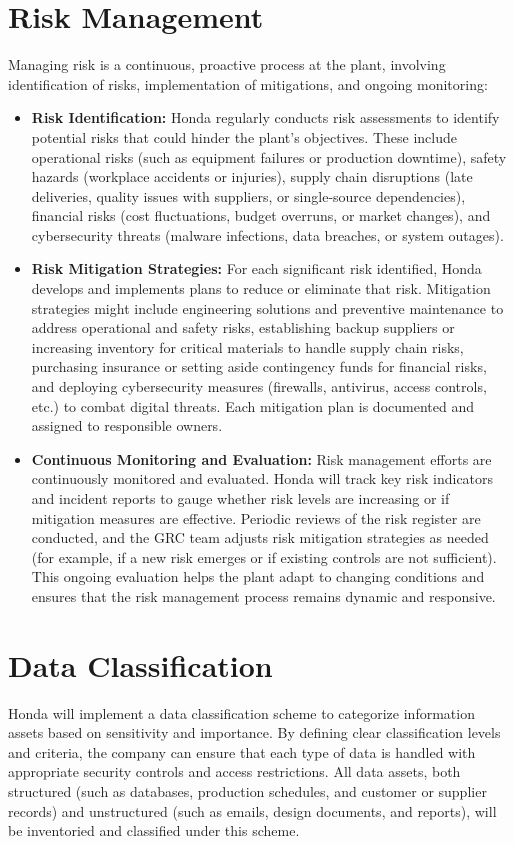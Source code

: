 \section{Risk Management}
Managing risk is a continuous, proactive process at the plant, involving identification of risks, implementation of mitigations, and ongoing monitoring:
\begin{itemize}
    \item \textbf{Risk Identification:} Honda regularly conducts risk assessments to identify potential risks that could hinder the plant's objectives. These include operational risks (such as equipment failures or production downtime), safety hazards (workplace accidents or injuries), supply chain disruptions (late deliveries, quality issues with suppliers, or single-source dependencies), financial risks (cost fluctuations, budget overruns, or market changes), and cybersecurity threats (malware infections, data breaches, or system outages).
    \item \textbf{Risk Mitigation Strategies:} For each significant risk identified, Honda develops and implements plans to reduce or eliminate that risk. Mitigation strategies might include engineering solutions and preventive maintenance to address operational and safety risks, establishing backup suppliers or increasing inventory for critical materials to handle supply chain risks, purchasing insurance or setting aside contingency funds for financial risks, and deploying cybersecurity measures (firewalls, antivirus, access controls, etc.) to combat digital threats. Each mitigation plan is documented and assigned to responsible owners.
    \item \textbf{Continuous Monitoring and Evaluation:} Risk management efforts are continuously monitored and evaluated. Honda will track key risk indicators and incident reports to gauge whether risk levels are increasing or if mitigation measures are effective. Periodic reviews of the risk register are conducted, and the GRC team adjusts risk mitigation strategies as needed (for example, if a new risk emerges or if existing controls are not sufficient). This ongoing evaluation helps the plant adapt to changing conditions and ensures that the risk management process remains dynamic and responsive.
\end{itemize}

\section{Data Classification}
Honda will implement a data classification scheme to categorize information assets based on sensitivity and importance. By defining clear classification levels and criteria, the company can ensure that each type of data is handled with appropriate security controls and access restrictions. All data assets, both structured (such as databases, production schedules, and customer or supplier records) and unstructured (such as emails, design documents, and reports), will be inventoried and classified under this scheme.


